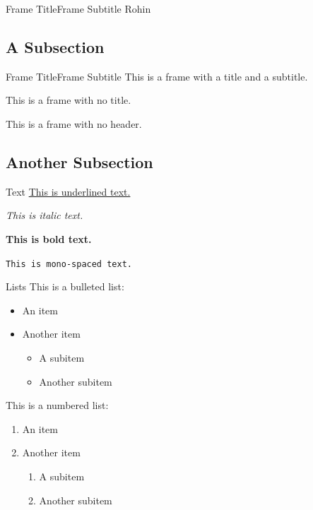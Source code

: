 \documentclass{beamer}
\begin{document}
\begin{frame}{Frame Title}{Frame Subtitle}
        Rohin

    \end{frame}

\subsection{A Subsection}

    \begin{frame}{Frame Title}{Frame Subtitle}
        This is a frame with a title and a subtitle.

    \end{frame}

    \begin{frame}{\null}
        This is a frame with no title.
    \end{frame}

    \begin{frame}
        This is a frame with no header.
    \end{frame}

\subsection{Another Subsection}

    \begin{frame}{Text}
        \underline{This is underlined text.}

        \textit{This is italic text.}

        \textbf{This is bold text.}

        \texttt{This is mono-spaced text.}
    \end{frame}

    \begin{frame}{Lists}
        This is a bulleted list:
        \begin{itemize}
            \item An item

            \item Another item
            \begin{itemize}
                \item A subitem

                \item Another subitem
            \end{itemize}
        \end{itemize}

        This is a numbered list:
        \begin{enumerate}
            \item An item

            \item Another item
            \begin{enumerate}
                \item A subitem

                \item Another subitem
            \end{enumerate}
        \end{enumerate}
    \end{frame}
\end{document}
